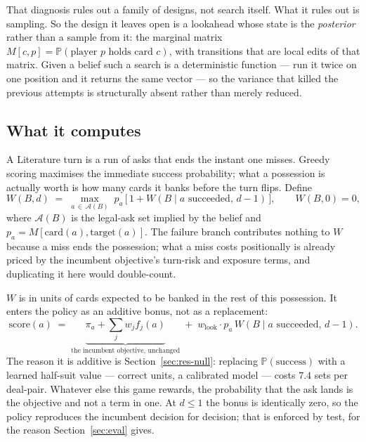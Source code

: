 \documentclass[11pt,a4paper]{article}
\newcommand{\Prob}{\ensuremath{\mathbb{P}}}
\begin{document}
That diagnosis rules out a family of designs, not search itself. What it rules
out is sampling. So the design it leaves open is a lookahead whose state is the
\emph{posterior} rather than a sample from it: the marginal matrix
$M[c,p] = \Prob(\text{player } p \text{ holds card } c)$, with transitions that
are local edits of that matrix. Given a belief such a search is a deterministic
function --- run it twice on one position and it returns the same vector --- so
the variance that killed the previous attempts is structurally absent rather
than merely reduced.

\subsection{What it computes}

A Literature turn is a run of asks that ends the instant one misses. Greedy
scoring maximises the immediate success probability; what a possession is
actually worth is how many cards it banks before the turn flips. Define
\begin{equation}
W(B, d) \;=\; \max_{a \,\in\, \mathcal{A}(B)}\;
p_a \,\bigl[\, 1 + W(B \mid a \text{ succeeded},\, d-1) \,\bigr],
\qquad W(B, 0) = 0,
\label{eq:chain}
\end{equation}
where $\mathcal{A}(B)$ is the legal-ask set implied by the belief and
$p_a = M[\text{card}(a), \text{target}(a)]$. The failure branch contributes
nothing to $W$ because a miss ends the possession; what a miss costs
positionally is already priced by the incumbent objective's turn-risk and
exposure terms, and duplicating it here would double-count.

$W$ is in units of cards expected to be banked in the rest of this possession.
It enters the policy as an additive bonus, not as a replacement:
\begin{equation}
\text{score}(a) \;=\; \underbrace{\pi_a + \textstyle\sum_j w_j f_j(a)}
_{\text{the incumbent objective, unchanged}}
\;+\; w_{\mathrm{look}} \cdot p_a \, W(B \mid a \text{ succeeded},\, d-1).
\label{eq:lookscore}
\end{equation}
The reason it is additive is Section~\ref{sec:res-null}: replacing
$\Prob(\text{success})$ with a learned half-suit value --- correct units, a
calibrated model --- costs $7.4$ sets per deal-pair. Whatever else this game
rewards, the probability that the ask lands is the objective and not a term in
one. At $d \le 1$ the bonus is identically zero, so the policy reproduces the
incumbent decision for decision; that is enforced by test, for the reason
Section~\ref{sec:eval} gives.
\end{document}
